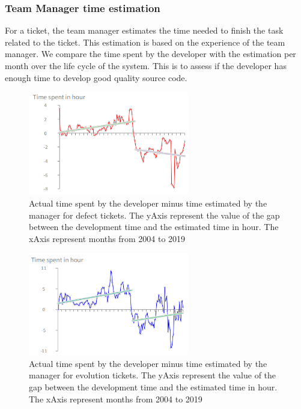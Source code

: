 \documentclass[10pt,conference]{IEEEtran}
\begin{document}
 \subsubsection{Team Manager time estimation}

For a ticket, the team manager estimates the time needed to finish the task related to the ticket.
This estimation is based on the experience of the team manager.  
We compare the time spent by the developer with the estimation per month over the life cycle of the system.  
This is to assess if the developer has enough time to develop good quality source code.

\begin{figure}[H]
  \centering
  \includegraphics[width=70mm]{./images/estimateBug.png}
  \caption{Actual time spent by the developer minus time estimated by the manager for defect tickets.  The yAxis represent the value of the gap between the development time and the estimated time in hour. The xAxis represent months from 2004 to 2019}
  \label{fig:devEstDefect}
\end{figure}

\begin{figure}[H]
  \centering
  \includegraphics[width=70mm]{./images/estimateEvol.png}
  \caption{Actual time spent by the developer minus time estimated by the manager for evolution tickets. 
    The yAxis represent the value of the gap between the development time and the estimated time in hour. 
    The xAxis represent months from 2004 to 2019}
  \label{fig:devEstEvol}
\end{figure}
\end{document}
